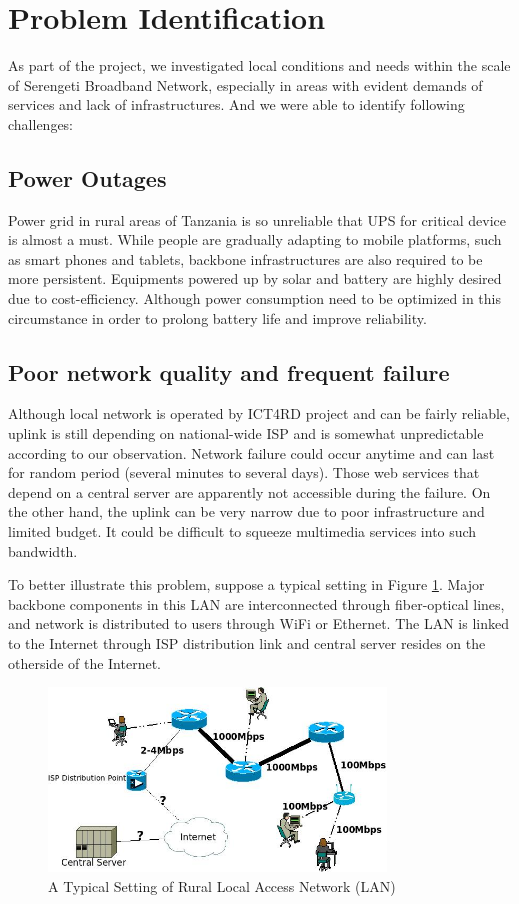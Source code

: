 \section{Problem Identification}
As part of the project, we investigated local conditions and needs within the scale of Serengeti Broadband Network, especially in areas with evident demands of services and lack of infrastructures. And we were able to identify following challenges:

\subsection{Power Outages}
Power grid in rural areas of Tanzania is so unreliable that UPS for critical device is almost a must. While people are gradually adapting to mobile platforms, such as smart phones and tablets, backbone infrastructures are also required to be more persistent. Equipments powered up by solar and battery are highly desired due to cost-efficiency. Although power consumption need to be optimized in this circumstance in order to prolong battery life and improve reliability.

\subsection{Poor network quality and frequent failure}
Although local network is operated by ICT4RD project and can be fairly reliable, uplink is still depending on national-wide ISP and is somewhat unpredictable according to our observation. Network failure could occur anytime and can last for random period (several minutes to several days). Those web services that depend on a central server are apparently not accessible during the failure. On the other hand, the uplink can be very narrow due to poor infrastructure and limited budget. It could be difficult to squeeze multimedia services into such bandwidth.

To better illustrate this problem, suppose a typical setting in Figure \ref{rural_lan}. Major backbone components in this LAN are interconnected through fiber-optical lines, and network is distributed to users through WiFi or Ethernet. The LAN is linked to the Internet through ISP distribution link and central server resides on the otherside of the Internet.

\begin{figure}
\centering
\includegraphics[width=0.8\textwidth]{../images/brief_diagram_of_sbn_network.jpeg}
\caption{A Typical Setting of Rural Local Access Network (LAN)}
\label{rural_lan}
\end{figure}

